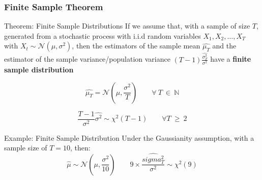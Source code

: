 \documentclass{beamer}
\begin{document}
  \begin{frame}
    \frametitle{Finite Sample Theorem}
    \begin{block}{Theorem: Finite Sample Distributions}
        If we assume that, with a sample of size $T$, generated from a stochastic process with i.i.d random variables $X_1, X_2, \dots, X_T$  with $X_{t} \sim \mathcal{N}(\mu, \sigma^2)$, then the estimators of the sample mean $\hat{\mu_T}$ and the estimator of the sample variance/population variance $(T-1) \frac{\hat{\sigma^2_T}}{\sigma^2}$ have a \textbf{finite sample distribution}

        \begin{equation*}
          \hat{\mu_T} = \mathcal{N}\left(\mu, \frac{\sigma^2}{T} \right) \qquad \forall \ T \ \in \ \mathbb{N}
        \end{equation*}


        \begin{equation*}
          \frac{T-1}{\sigma^2} \hat{\sigma^2} \sim \chi^{2} (T-1) \qquad \forall T \ \geq \ 2
        \end{equation*}
        
      \end{block}
\end{frame}


\begin{frame}
      \begin{exampleblock}{Example: Finite Sample Distribution}
        Under the Gaussianity assumption, with a sample size of $T = 10$, then:
        \begin{equation*}
          \hat{\mu} \sim \mathcal{N}\left( \mu, \frac{\sigma^2}{10} \right) \qquad 9 \times \frac{\hat{sigma^2_T}}{\sigma^2} \sim \chi^2(9)
        \end{equation*}        
      \end{exampleblock}
      
  \end{frame}
  
\end{document}
